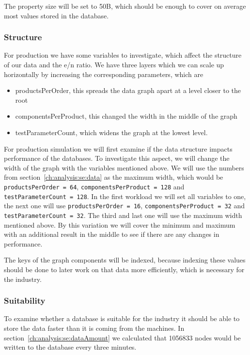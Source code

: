 The property size will be set to 50B,
which should be enough to cover on average most values stored in the database.

\subsubsection{Structure}
For production we have some variables to investigate,
which affect the structure of our data and the e/n ratio.
We have three layers which we can scale up horizontally by increasing the corresponding parameters,
which are

\begin{itemize}
  \item productsPerOrder, this spreads the data graph apart at a level closer to the root
  \item componentsPerProduct, this changed the width in the middle of the graph
  \item testParameterCount, which widens the graph at the lowest level.
\end{itemize}

For production simulation we will first examine if the data structure impacts performance of the databases.
To investigate this aspect,
we will change the width of the graph with the variables mentioned above.
We will use the numbers from section~\ref{ch:analysis:se:data} as the maximum width,
which would be \texttt{productsPerOrder = 64},
\texttt{componentsPerProduct = 128} and \texttt{testParameterCount = 128}.
In the first workload we will set all variables to one,
the next one will use \texttt{productsPerOrder = 16},
\texttt{componentsPerProduct = 32} and \texttt{testParameterCount = 32}.
The third and last one will use the maximum width mentioned above.
By this variation we will cover the minimum and maximum with an additional result in the middle to see if there are any changes in performance.

The keys of the graph components will be indexed,
because indexing these values should be done to later work on that data more efficiently,
which is necessary for the industry.

\subsubsection{Suitability}
\label{ch:design:se:suitability}
To examine whether a database is suitable for the industry it should be able to store the data faster than it is coming from the machines.
In section~\ref{ch:analysis:se:dataAmount} we calculated that 1056833 nodes would be written to the database every three minutes.

